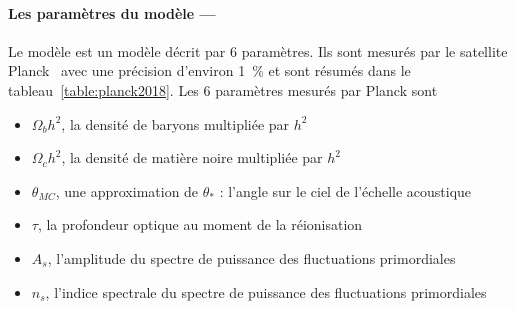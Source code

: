 \documentclass[11pt, twoside, a4paper, openright]{report}
\begin{document}
\paragraph{Les paramètres du modèle —} 
Le modèle \lcdm{} est un modèle décrit par 6 paramètres. Ils sont mesurés par le satellite Planck~\cite{CITE ref} avec une précision d'environ 1~\% et sont résumés dans le tableau~\ref{table:planck2018}. Les 6 paramètres mesurés par Planck sont
\begin{itemize}
\item $\Omega_bh^2$, la densité de baryons multipliée par $h^2$
\item $\Omega_ch^2$, la densité de matière noire multipliée par $h^2$
\item $\theta_{MC}$, une approximation de $\theta_*$ : l'angle sur le ciel de l'échelle acoustique
\item $\tau$, la profondeur optique au moment de la réionisation
\item $A_s$, l'amplitude du spectre de puissance des fluctuations primordiales 
\item $n_s$, l'indice spectrale du spectre de puissance des fluctuations primordiales
\end{itemize}
\end{document}

